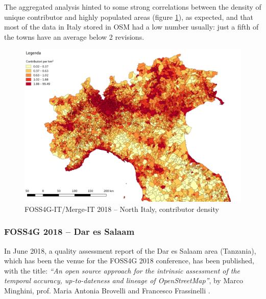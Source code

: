 \documentclass{Configuration_Files/PoliMi3i_thesis}
\begin{document}
The aggregated analysis hinted to some strong correlations between the density of unique contributor and highly populated areas (figure \ref{fig:contributors_density_north}), as expected, and that most of the data in Italy stored in OSM had a low number usually: just a fifth of the towns have an average below 2 revisions.

\begin{figure}[ht]
    \centering
    \includegraphics[width=1\textwidth]{Images/contributors_density_north.png}
    \caption{FOSS4G-IT/Merge-IT 2018 – North Italy, contributor density}
    \label{fig:contributors_density_north}
\end{figure}


\subsubsection{FOSS4G 2018 – Dar es Salaam}

In June 2018, a quality assessment report of the Dar es Salaam area (Tanzania), which has been the venue for the FOSS4G 2018 conference, has been published, with the title: \textit{“An open source approach for the intrinsic assessment of the temporal accuracy, up-to-dateness and lineage of OpenStreetMap”}, by Marco Minghini, prof. Maria Antonia Brovelli and Francesco Frassinelli \cite{minghiniOpenSourceApproach2018}.
\end{document}
